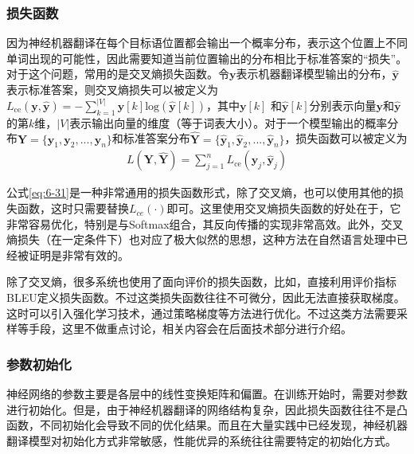 \subsubsection{损失函数}

\parinterval 因为神经机器翻译在每个目标语位置都会输出一个概率分布，表示这个位置上不同单词出现的可能性，因此需要知道当前位置输出的分布相比于标准答案的``损失''。对于这个问题，常用的是交叉熵损失函数。令$\mathbf{y}$表示机器翻译模型输出的分布，$\hat{\mathbf{y}}$ 表示标准答案，则交叉熵损失可以被定义为$L_{\textrm{ce}}(\mathbf{y},\hat{\mathbf{y}}) = - \sum_{k=1}^{|V|} \mathbf{y}[k] \textrm{log} (\hat{\mathbf{y}}[k])$，其中$\mathbf{y}[k]$ 和$\hat{\mathbf{y}}[k]$分别表示向量$\mathbf{y}$和$\hat{\mathbf{y}}$的第$k$维，$|V|$表示输出向量的维度（等于词表大小）。对于一个模型输出的概率分布$\mathbf{Y} = \{ \mathbf{y}_1,\mathbf{y}_2,..., \mathbf{y}_n \}$和标准答案分布$\widehat{\mathbf{Y}}=\{ \hat{\mathbf{y}}_1, \hat{\mathbf{y}}_2,...,\hat{\mathbf{y}}_n \}$，损失函数可以被定义为
\begin{eqnarray}
L(\mathbf{Y},\widehat{\mathbf{Y}}) = \sum_{j=1}^n L_{\textrm{ce}}(\mathbf{y}_j,\hat{\mathbf{y}}_j)
\label{eq:6-31}
\end{eqnarray}

\parinterval 公式\ref{eq:6-31}是一种非常通用的损失函数形式，除了交叉熵，也可以使用其他的损失函数，这时只需要替换$L_{ce} (\cdot)$即可。这里使用交叉熵损失函数的好处在于，它非常容易优化，特别是与Softmax组合，其反向传播的实现非常高效。此外，交叉熵损失（在一定条件下）也对应了极大似然的思想，这种方法在自然语言处理中已经被证明是非常有效的。

\parinterval 除了交叉熵，很多系统也使用了面向评价的损失函数，比如，直接利用评价指标BLEU定义损失函数。不过这类损失函数往往不可微分，因此无法直接获取梯度。这时可以引入强化学习技术，通过策略梯度等方法进行优化。不过这类方法需要采样等手段，这里不做重点讨论，相关内容会在后面技术部分进行介绍。


\subsubsection{参数初始化}

\parinterval 神经网络的参数主要是各层中的线性变换矩阵和偏置。在训练开始时，需要对参数进行初始化。但是，由于神经机器翻译的网络结构复杂，因此损失函数往往不是凸函数，不同初始化会导致不同的优化结果。而且在大量实践中已经发现，神经机器翻译模型对初始化方式非常敏感，性能优异的系统往往需要特定的初始化方式。

